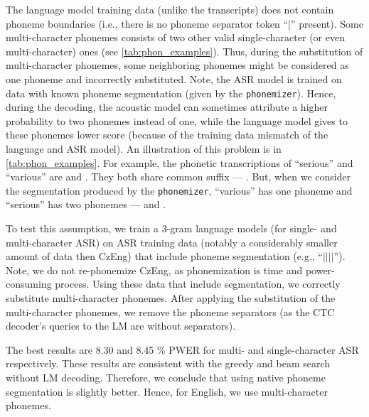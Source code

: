 The language model training data (unlike the transcripts) does not contain phoneme boundaries (i.e., there is no phoneme separator token ``$\mid$'' present). Some multi-character phonemes consists of two other valid single-character (or even multi-character) ones (see \cref{tab:phon_examples}). Thus, during the substitution of multi-character phonemes, some neighboring phonemes might be considered as one phoneme and incorrectly substituted. Note, the ASR model is trained on data with known phoneme segmentation (given by the \texttt{phonemizer}). Hence, during the decoding, the acoustic model can sometimes attribute a higher probability to two phonemes instead of one, while the language model gives to these phonemes lower score (because of the training data mismatch of the language and ASR model). An illustration of this problem is in \cref{tab:phon_examples}. For example, the phonetic transcriptions of ``serious'' and ``various'' are  and . They both share common suffix --- . But, when we consider the segmentation produced by the \texttt{phonemizer}, ``various'' has one phoneme  and ``serious'' has two phonemes ---  and .

To test this assumption, we train a 3-gram language models (for single- and multi-character ASR) on ASR training data (notably a considerably smaller amount of data then CzEng) that include phoneme segmentation (e.g., ``$\mid$$\mid$$\mid$$\mid$''). Note, we do not re-phonemize CzEng, as phonemization is time and power-consuming process. Using these data that include segmentation, we correctly substitute multi-character phonemes. After applying the substitution of the multi-character phonemes, we remove the phoneme separators (as the CTC decoder's queries to the LM are without separators).

The best results are 8.30 and 8.45 \% PWER for multi- and single-character ASR respectively. These results are consistent with the greedy and beam search without LM decoding. Therefore, we conclude that using native phoneme segmentation is slightly better. Hence, for English, we use multi-character phonemes.

